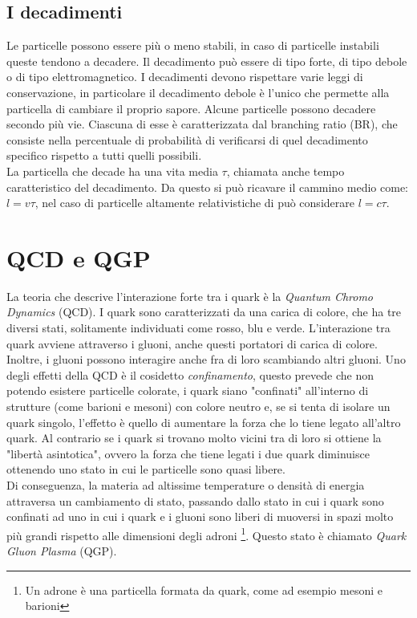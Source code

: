     \subsection{I decadimenti}
    Le particelle possono essere più o meno stabili, in caso di particelle instabili queste tendono a decadere. Il decadimento può essere di tipo forte, di tipo debole o di tipo elettromagnetico. I decadimenti devono rispettare varie leggi di conservazione, in particolare il decadimento debole è l'unico che permette alla particella di cambiare il proprio sapore. Alcune particelle possono decadere secondo più vie. Ciascuna di esse è caratterizzata dal branching ratio (BR), che consiste nella percentuale di probabilità di verificarsi di quel decadimento specifico rispetto a tutti quelli possibili.
    \\La particella che decade ha una vita media $\tau$, chiamata anche tempo caratteristico del decadimento. Da questo si può ricavare il cammino medio come: $l = v \tau$, nel caso di particelle altamente relativistiche di può considerare $l = c \tau$. 
    
    
\section{QCD e QGP}
La teoria che descrive l'interazione forte tra i quark è la \textit{Quantum Chromo Dynamics} (QCD). I quark sono caratterizzati da una carica di colore, che ha tre diversi stati, solitamente individuati come rosso, blu e verde. L'interazione tra quark avviene attraverso i gluoni, anche questi portatori di carica di colore. Inoltre, i gluoni possono interagire anche fra di loro scambiando altri gluoni. Uno degli effetti della QCD è il cosidetto \textit{confinamento}, questo prevede che non potendo esistere particelle colorate, i quark siano "confinati" all'interno di strutture (come barioni e mesoni) con colore neutro e, se si tenta di isolare un quark singolo, l'effetto è quello di aumentare la forza che lo tiene legato all'altro quark. Al contrario se i quark si trovano molto vicini tra di loro si ottiene la "libertà asintotica", ovvero la forza che tiene legati i due quark diminuisce ottenendo uno stato in cui le particelle sono quasi libere. \cite{libro_nucleare}
\\Di conseguenza, la materia ad altissime temperature o densità di energia attraversa un cambiamento di stato, passando dallo stato in cui i quark sono confinati ad uno in cui i quark e i gluoni sono liberi di muoversi in spazi molto più grandi rispetto alle dimensioni degli adroni \footnote{Un adrone è una particella formata da quark, come ad esempio mesoni e barioni}. Questo stato è chiamato \textit{Quark Gluon Plasma} (QGP). \cite{QCD} 

